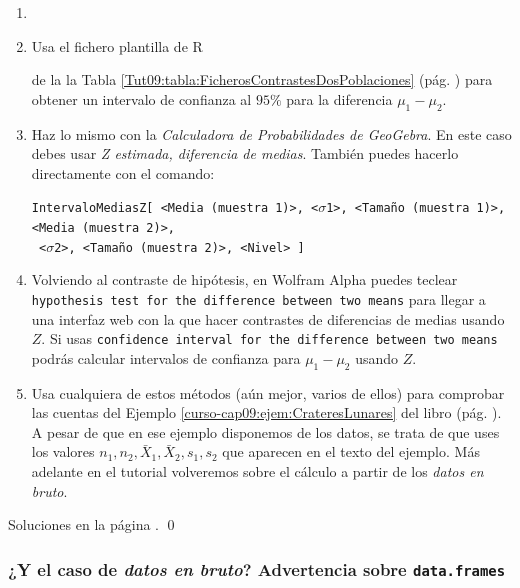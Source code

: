 \documentclass[10pt,a4paper]{article}\usepackage[]{graphicx}\usepackage[]{color}
\newcounter {cont01}
\begin{document}
\begin{ejercicio}
\label{tut09:ejercicio02}

\begin{enumerate}
\item[]
\item Usa el fichero plantilla de R
\begin{center}
\end{center}
de la la Tabla \ref{Tut09:tabla:FicherosContrastesDosPoblaciones} (pág. \pageref{Tut09:tabla:FicherosContrastesDosPoblaciones}) para obtener un intervalo de confianza al $95\%$ para la diferencia $\mu_1 - \mu_2$.

\item Haz lo mismo con la {\em Calculadora de Probabilidades de GeoGebra}. En este caso debes usar
{\em Z estimada, diferencia de medias}. También puedes hacerlo directamente con el comando:
\begin{center}
{\small
\verb&IntervaloMediasZ[ <Media (muestra 1)>, <&$\sigma$\verb&1>, <Tamaño (muestra 1)>, <Media (muestra 2)>,&\\\verb& <&$\sigma$\verb&2>, <Tamaño (muestra 2)>, <Nivel> ]&
}
\end{center}

\item Volviendo al contraste de hipótesis, en Wolfram Alpha puedes teclear {\tt hypothesis test for the difference between two means} para llegar a una interfaz web con la que hacer contrastes de diferencias de medias usando $Z$. Si usas {\tt confidence interval for the difference between two means} podrás calcular intervalos de confianza para $\mu_1 - \mu_2$ usando $Z$.

\item Usa cualquiera de estos métodos (aún mejor, varios de ellos) para comprobar las cuentas del Ejemplo \ref{curso-cap09:ejem:CrateresLunares} del libro (pág. \pageref{curso-cap09:ejem:CrateresLunares}). A pesar de que en ese ejemplo disponemos de los datos, se trata de que uses los valores $n_1, n_2, {\bar X}_1, {\bar X}_2, s_1, s_2$ que aparecen en el texto del ejemplo. Más adelante en el tutorial volveremos sobre el cálculo a partir de los {\em datos en bruto}.
\end{enumerate}
Soluciones en la página \pageref{tut09:ejercicio02:sol}.
\qed
\end{ejercicio}

\subsubsection*{¿Y el caso de {\em datos en bruto}? Advertencia sobre {\tt data.frames}}
\end{document}
